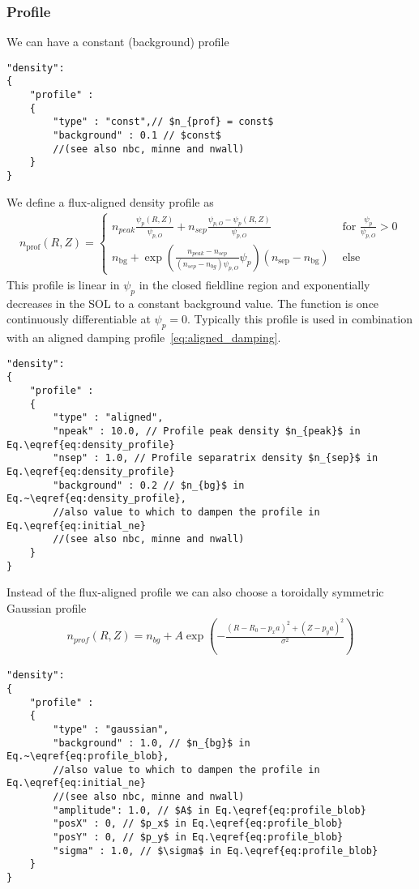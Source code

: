 \subsubsection{Profile} \label{sec:profile}
We can have a constant (background) profile
\begin{verbatim}
"density":
{
    "profile" :
    {
        "type" : "const",// $n_{prof} = const$
        "background" : 0.1 // $const$
        //(see also nbc, minne and nwall)
    }
}
\end{verbatim}
 \noindent
We define a flux-aligned density profile as
\begin{align} \label{eq:density_profile}
    n_{\text{prof}}(R,Z)= \begin{cases}
        n_{peak}\frac{\psi_p(R,Z) }{\psi_{p,O}} + n_{sep} \frac{\psi_{p,O} - \psi_p(R,Z)}{\psi_{p,O}} &\text{ for } \frac{\psi_p}{\psi_{p,O}} > 0\\
        n_{\text{bg}} + \exp\left( \frac{n_{peak} - n_{sep}}{(n_{sep}-n_{bg})\psi_{p,O}}\psi_p\right) ( n_\text{sep} - n_{\text{bg}})&\text{ else }
    \end{cases}
\end{align}
This profile is linear in $\psi_p$ in the closed fieldline region and exponentially
decreases in the SOL to a constant background value.
The function is once continuously differentiable at $\psi_p =0$.
Typically this profile is used in combination with an aligned damping profile~\eqref{eq:aligned_damping}.
\begin{verbatim}
"density":
{
    "profile" :
    {
        "type" : "aligned",
        "npeak" : 10.0, // Profile peak density $n_{peak}$ in Eq.\eqref{eq:density_profile}
        "nsep" : 1.0, // Profile separatrix density $n_{sep}$ in Eq.\eqref{eq:density_profile}
        "background" : 0.2 // $n_{bg}$ in Eq.~\eqref{eq:density_profile},
        //also value to which to dampen the profile in Eq.\eqref{eq:initial_ne}
        //(see also nbc, minne and nwall)
    }
}
\end{verbatim}
\noindent
Instead of the flux-aligned profile we can also choose a toroidally symmetric Gaussian profile
\begin{align} \label{eq:profile_blob}
    n_{prof}(R,Z) = n_{bg} + A \exp\left( -\frac{(R - R_0 - p_x a)^2 + (Z-p_ya)^2}{\sigma^2} \right)
\end{align}
\begin{verbatim}
"density":
{
    "profile" :
    {
        "type" : "gaussian",
        "background" : 1.0, // $n_{bg}$ in Eq.~\eqref{eq:profile_blob},
        //also value to which to dampen the profile in Eq.\eqref{eq:initial_ne}
        //(see also nbc, minne and nwall)
        "amplitude": 1.0, // $A$ in Eq.\eqref{eq:profile_blob}
        "posX" : 0, // $p_x$ in Eq.\eqref{eq:profile_blob}
        "posY" : 0, // $p_y$ in Eq.\eqref{eq:profile_blob}
        "sigma" : 1.0, // $\sigma$ in Eq.\eqref{eq:profile_blob}
    }
}
\end{verbatim}
